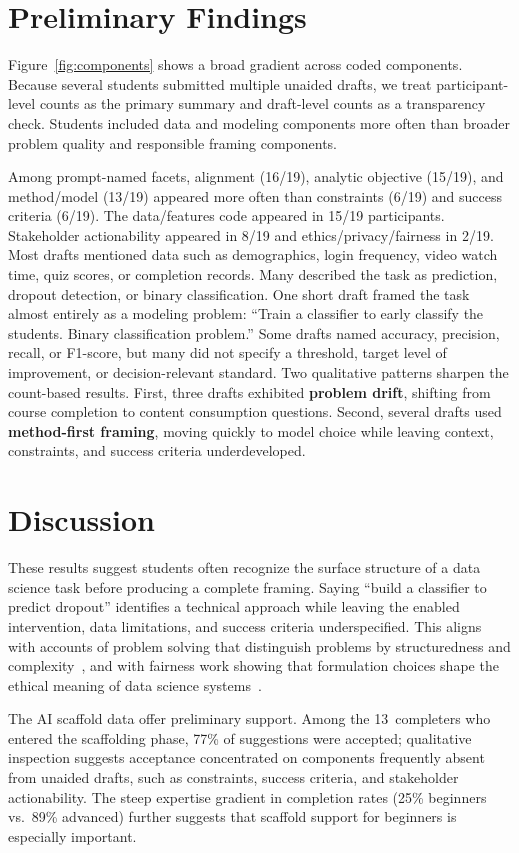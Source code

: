 \documentclass[sigconf,screen,anonymous]{acmart}
\begin{document}
\section{Preliminary Findings}
Figure~\ref{fig:components} shows a broad gradient across coded components. Because several students submitted multiple unaided drafts, we treat participant-level counts as the primary summary and draft-level counts as a transparency check. Students included data and modeling components more often than broader problem quality and responsible framing components.

Among prompt-named facets, alignment (16/19), analytic objective (15/19), and method/model (13/19) appeared more often than constraints (6/19) and success criteria (6/19). The data/features code appeared in 15/19 participants. Stakeholder actionability appeared in 8/19 and ethics/privacy/fairness in 2/19. Most drafts mentioned data such as demographics, login frequency, video watch time, quiz scores, or completion records. Many described the task as prediction, dropout detection, or binary classification. One short draft framed the task almost entirely as a modeling problem: ``Train a classifier to early classify the students. Binary classification problem.'' Some drafts named accuracy, precision, recall, or F1-score, but many did not specify a threshold, target level of improvement, or decision-relevant standard. Two qualitative patterns sharpen the count-based results. First, three drafts exhibited \textbf{problem drift}, shifting from course completion to content consumption questions. Second, several drafts used \textbf{method-first framing}, moving quickly to model choice while leaving context, constraints, and success criteria underdeveloped.

\section{Discussion}
These results suggest students often recognize the surface structure of a data science task before producing a complete framing. Saying ``build a classifier to predict dropout'' identifies a technical approach while leaving the enabled intervention, data limitations, and success criteria underspecified. This aligns with accounts of problem solving that distinguish problems by structuredness and complexity~\cite{jonassen2000design}, and with fairness work showing that formulation choices shape the ethical meaning of data science systems~\cite{passi2019problem}.

The AI scaffold data offer preliminary support. Among the 13~completers who entered the scaffolding phase, 77\% of suggestions were accepted; qualitative inspection suggests acceptance concentrated on components frequently absent from unaided drafts, such as constraints, success criteria, and stakeholder actionability. The steep expertise gradient in completion rates (25\% beginners vs.\ 89\% advanced) further suggests that scaffold support for beginners is especially important.
\end{document}
